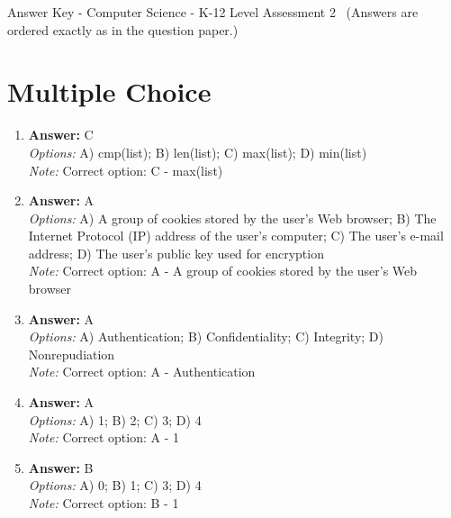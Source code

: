 \documentclass[12pt]{article}
\begin{document}
\begin{center}
Answer Key - Computer Science - K-12 Level Assessment 2 \
\small (Answers are ordered exactly as in the question paper.)
\end{center}

\section*{Multiple Choice}
\begin{enumerate}[label=\arabic*.]
\item \textbf{Answer:} C
\\ \textit{Options:} A) cmp(list); B) len(list); C) max(list); D) min(list)
\\ \textit{Note:} Correct option: C - max(list)
\item \textbf{Answer:} A
\\ \textit{Options:} A) A group of cookies stored by the user's Web browser; B) The Internet Protocol (IP) address of the user's computer; C) The user's e-mail address; D) The user's public key used for encryption
\\ \textit{Note:} Correct option: A - A group of cookies stored by the user's Web browser
\item \textbf{Answer:} A
\\ \textit{Options:} A) Authentication; B) Confidentiality; C) Integrity; D) Nonrepudiation
\\ \textit{Note:} Correct option: A - Authentication
\item \textbf{Answer:} A
\\ \textit{Options:} A) 1; B) 2; C) 3; D) 4
\\ \textit{Note:} Correct option: A - 1
\item \textbf{Answer:} B
\\ \textit{Options:} A) 0; B) 1; C) 3; D) 4
\\ \textit{Note:} Correct option: B - 1
\end{enumerate}
\end{document}
